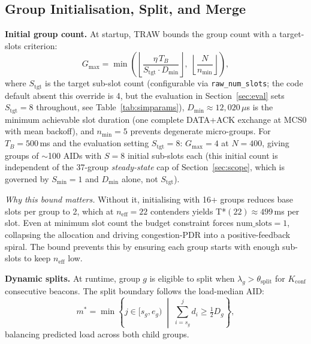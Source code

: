 \documentclass[journal]{IEEEtran}
\begin{document}
\subsection{Group Initialisation, Split, and Merge}
\label{sec:split_merge}

\textbf{Initial group count.}
At startup, TRAW bounds the group count with a target-slots criterion:
\begin{equation}
  G_\mathrm{max} = \min\!\left(
    \left\lfloor\frac{\eta\,T_B}{S_\mathrm{tgt}\cdot D_\mathrm{min}}\right\rfloor,\;
    \left\lfloor\frac{N}{n_\mathrm{min}}\right\rfloor
  \right),
  \label{eq:gmax}
\end{equation}
where $S_\mathrm{tgt}$ is the target sub-slot count (configurable via
\texttt{raw\_num\_slots}; the code default absent this override is 4,
but the evaluation in Section~\ref{sec:eval} sets
$S_\mathrm{tgt}\!=\!8$ throughout, see Table~\ref{tab:simparams}),
$D_\mathrm{min}\!\approx\!12{,}020\,\mu$s
is the minimum achievable slot duration (one complete DATA+ACK exchange
at MCS0 with mean backoff), and $n_\mathrm{min}\!=\!5$ prevents
degenerate micro-groups.
For $T_B\!=\!500$\,ms and the evaluation setting $S_\mathrm{tgt}\!=\!8$:
$G_\mathrm{max}\!=\!4$ at $N\!=\!400$, giving groups of $\sim$100 AIDs
with $S\!=\!8$ initial sub-slots each (this initial count is
independent of the 37-group \emph{steady-state} cap of
Section~\ref{sec:scope}, which is governed by $S_\mathrm{min}\!=\!1$ and
$D_\mathrm{min}$ alone, not $S_\mathrm{tgt}$).

\emph{Why this bound matters.}
Without it, initialising with 16+ groups reduces base slots per group to 2,
which at $n_\mathrm{eff}\!=\!22$ contenders yields
T*$(22)\!\approx\!499$\,ms per slot.
Even at minimum slot count the budget constraint forces
$\text{num\_slots}\!=\!1$, collapsing the allocation and driving
congestion-PDR into a positive-feedback spiral.
The bound prevents this by ensuring each group starts with enough
sub-slots to keep $n_\mathrm{eff}$ low.

\textbf{Dynamic splits.}
At runtime, group $g$ is eligible to split when
$\lambda_g\!>\!\theta_\mathrm{split}$ for $K_\mathrm{conf}$
consecutive beacons.
The split boundary follows the load-median AID:
\begin{equation}
  m^* = \min\!\left\{j \in [s_g,e_g)\;\middle|\;\sum_{i=s_g}^{j}d_i
    \geq \tfrac{1}{2}D_g\right\},
  \label{eq:splitpoint}
\end{equation}
balancing predicted load across both child groups.
\end{document}
